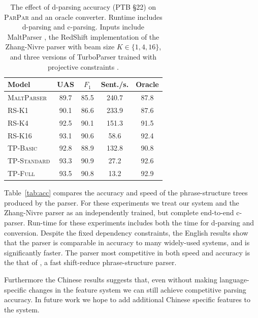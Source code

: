 \documentclass[11pt,letterpaper]{article}
\newcommand{\ParseName}{\textsc{ParPar}\xspace}
\begin{document}
\begin{table}
  \centering
  \small

  \begin{tabular}{|l|cccc|}
    \hline
    Model & UAS  & $F_1$ & Sent./s.  & Oracle  \\
    \hline

    \hline
    \textsc{MaltParser}  & 89.7 & 85.5 & 240.7& 87.8 \\
    \textsc{RS-K1}       & 90.1 & 86.6 & 233.9& 87.6 \\
    \textsc{RS-K4}       & 92.5 & 90.1 & 151.3& 91.5 \\
    \textsc{RS-K16}      & 93.1 & 90.6 & 58.6 & 92.4 \\
    \textsc{TP-Basic}    & 92.8 & 88.9 & 132.8& 90.8 \\
    \textsc{TP-Standard} & 93.3 & 90.9 & 27.2 & 92.6 \\
    \textsc{TP-Full}     & 93.5 & 90.8 & 13.2 & 92.9 \\
    \hline
  \end{tabular}


  
  \caption{The effect of d-parsing accuracy (PTB \S 22)
    on \ParseName{} and an oracle converter.  Runtime includes
    d-parsing and c-parsing.  
    Inputs include 
 MaltParser \cite{nivre2006maltparser}, 
    the RedShift implementation of the Zhang-Nivre parser
    \cite{zhang2011transition} with beam size $K \in \{1, 4, 16\}$,
and three versions of TurboParser trained with projective constraints
    \cite{martins2013turning}.
\label{tab:oracle} }
\end{table}


Table~\ref{tab:acc} compares the accuracy and speed of the
phrase-structure trees produced by the parser.  For these experiments
we treat our system and the Zhang-Nivre parser as an independently
trained, but complete end-to-end c-parser. Run-time for these
experiments includes both the time for d-parsing and conversion.
Despite the fixed dependency constraints, the English results show
that the parser is comparable in accuracy to many widely-used systems,
and is significantly faster. The parser most competitive in both speed
and accuracy is the that of , a fast shift-reduce
phrase-structure parser.

Furthermore the Chinese results suggests that, even without making
language-specific changes in the feature system we can still achieve
competitive parsing accuracy.  In future work we hope to add
additional Chinese specific features to the system.
\end{document}

